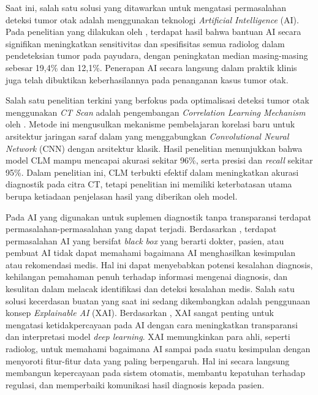 Saat ini, salah satu solusi yang ditawarkan untuk mengatasi permasalahan deteksi tumor otak adalah menggunakan teknologi \textit{Artificial Intelligence} (AI). Pada penelitian yang dilakukan oleh \textcite{darmiati2023impact}, terdapat hasil bahwa bantuan AI secara signifikan meningkatkan sensitivitas dan spesifisitas semua radiolog dalam pendeteksian tumor pada payudara, dengan peningkatan median masing-masing sebesar 19,4\% dan 12,1\%. Penerapan AI secara langsung dalam praktik klinis juga telah dibuktikan keberhasilannya pada penanganan kasus tumor otak.

Salah satu penelitian terkini yang berfokus pada optimalisasi deteksi tumor otak menggunakan \textit{CT Scan} adalah pengembangan \textit{Correlation Learning Mechanism} oleh \textcite{wozniak2021deep}. Metode ini mengusulkan mekanisme pembelajaran korelasi baru untuk arsitektur jaringan saraf dalam yang menggabungkan \textit{Convolutional Neural Network} (CNN) dengan arsitektur klasik. Hasil penelitian menunjukkan bahwa model CLM mampu mencapai akurasi sekitar 96\%, serta presisi dan \textit{recall} sekitar 95\%. Dalam penelitian ini, CLM terbukti efektif dalam meningkatkan akurasi diagnostik pada citra CT, tetapi penelitian ini memiliki keterbatasan utama berupa ketiadaan penjelasan hasil yang diberikan oleh model.

Pada AI yang digunakan untuk suplemen diagnostik tanpa transparansi terdapat permasalahan-permasalahan yang dapat terjadi. Berdasarkan \textcite{xu2023medical}, terdapat permasalahan AI yang bersifat \textit{black box} yang berarti dokter, pasien, atau pembuat AI tidak dapat memahami bagaimana AI menghasilkan kesimpulan atau rekomendasi medis. Hal ini dapat menyebabkan potensi kesalahan diagnosis, kehilangan pemahaman penuh terhadap informasi mengenai diagnosis, dan kesulitan dalam melacak identifikasi dan deteksi kesalahan medis. Salah satu solusi kecerdasan buatan yang saat ini sedang dikembangkan adalah penggunaan konsep \textit{Explainable AI} (XAI). Berdasarkan \textcite{asmita2025from}, XAI sangat penting untuk mengatasi ketidakpercayaan pada AI dengan cara meningkatkan transparansi dan interpretasi model \textit{deep learning}. XAI memungkinkan para ahli, seperti radiolog, untuk memahami bagaimana AI sampai pada suatu kesimpulan dengan menyoroti fitur-fitur data yang paling berpengaruh. Hal ini secara langsung membangun kepercayaan pada sistem otomatis, membantu kepatuhan terhadap regulasi, dan memperbaiki komunikasi hasil diagnosis kepada pasien.

